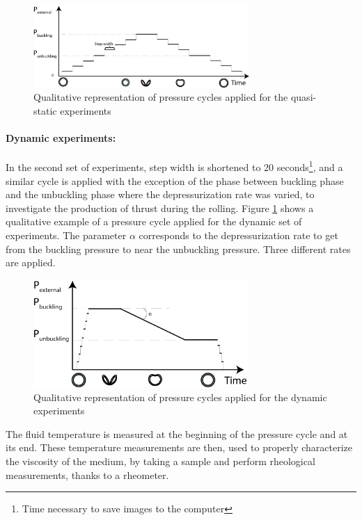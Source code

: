 \begin{figure}[H] %
	\centering%
  \includegraphics[width=0.73\textwidth]{figures/Chapter_1/quasi_static_pressure_cycle.png}
	\caption{Qualitative representation of pressure cycles applied for the quasi-static experiments}
	\label{fig:quasi_static_pressure_cycle}
\end{figure}
\paragraph{Dynamic experiments:}
In the second set of experiments, step width is shortened to 20 seconds\footnote{Time necessary to save images to the computer}, and a similar cycle is applied with the exception of the phase between buckling phase and the unbuckling phase where the depressurization rate was varied, to investigate the production of thrust during the rolling. 
Figure \ref{fig:quasi_static_pressure_cycle} shows a qualitative example of a pressure cycle applied for the dynamic set of experiments. The parameter $\alpha$ corresponds to the depressurization rate to get from the buckling pressure to near the unbuckling pressure. Three different rates are applied.
\begin{figure}[H] %
	\centering%
  \includegraphics[width=0.73\textwidth]{figures/Chapter_1/dynamic_pressure_cycle.png}
	\caption{Qualitative representation of pressure cycles applied for the dynamic experiments}
	\label{fig:dynamic_pressure_cycle}
\end{figure}
The fluid temperature is measured at the beginning of the pressure cycle and at its end. These temperature measurements are then, used to properly characterize the viscosity of the medium, by taking a sample and perform rheological measurements, thanks to a rheometer.\\
